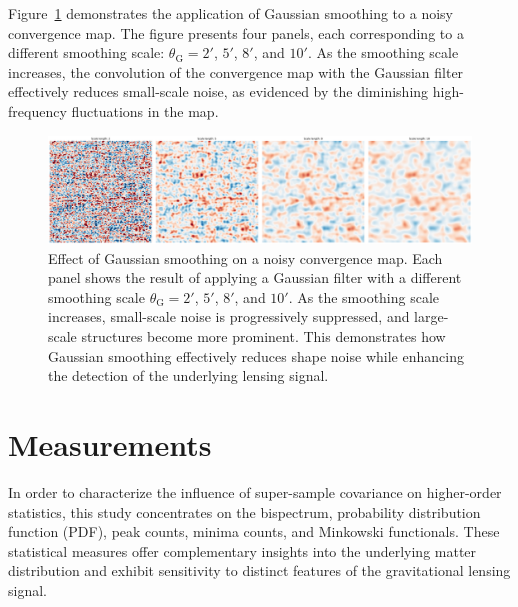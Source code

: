 Figure~\ref{fig:smoothing} demonstrates the application of Gaussian smoothing to a noisy convergence map. The figure presents four panels, each corresponding to a different smoothing scale: $\theta_{\mathrm{G}} = 2'$, $5'$, $8'$, and $10'$. As the smoothing scale increases, the convolution of the convergence map with the Gaussian filter effectively reduces small-scale noise, as evidenced by the diminishing high-frequency fluctuations in the map. 
\begin{figure}[ht]
    \centering
    \includegraphics[width=\textwidth]{figures/smoothed_comparison.png}
    \caption{Effect of Gaussian smoothing on a noisy convergence map. Each panel shows the result of applying a Gaussian filter with a different smoothing scale $\theta_{\mathrm{G}} = 2'$, $5'$, $8'$, and $10'$. As the smoothing scale increases, small-scale noise is progressively suppressed, and large-scale structures become more prominent. This demonstrates how Gaussian smoothing effectively reduces shape noise while enhancing the detection of the underlying lensing signal.}
\label{fig:smoothing}
\end{figure}

\section{Measurements}
In order to characterize the influence of super-sample covariance on higher-order statistics, this study concentrates on the bispectrum, probability distribution function (PDF), peak counts, minima counts, and Minkowski functionals. These statistical measures offer complementary insights into the underlying matter distribution and exhibit sensitivity to distinct features of the gravitational lensing signal.

